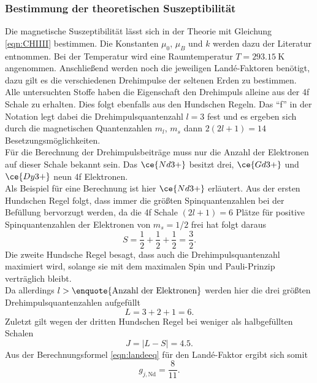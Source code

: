 \subsubsection{Bestimmung der theoretischen Suszeptibilität}

Die magnetische Suszeptibilität lässt sich in der Theorie mit Gleichung \eqref{eqn:CHIIII} bestimmen. Die Konstanten $\mu_0$, $\mu_B$ und $k$ werden dazu der Literatur \cite{lit2} entnommen.
Bei der Temperatur wird eine Raumtemperatur $T = \SI{293.15}{\kelvin}$ angenommen.
Anschließend werden noch die jeweiligen Landé-Faktoren benötigt, dazu gilt es die verschiedenen Drehimpulse der seltenen Erden zu bestimmen. Alle untersuchten Stoffe haben die Eigenschaft
den Drehimpuls alleine aus der 4f Schale zu erhalten. Dies folgt ebenfalls aus den Hundschen Regeln. Das \enquote{f} in der Notation legt dabei die Drehimpulsquantenzahl $l = 3$ fest und es ergeben sich
durch die magnetischen Quantenzahlen $m_l$, $m_s$ dann $2(2l+1) = 14$ Besetzungsmöglichkeiten. 
\\
Für die Berechnung der Drehimpulsbeiträge muss nur die Anzahl der Elektronen auf dieser Schale bekannt sein. Das $\ce{Nd3+}$ besitzt drei, $\ce{Gd3+}$ und $\ce{Dy3+}$ neun 4f Elektronen.
\\
Als Beispiel für eine Berechnung ist hier $\ce{Nd3+}$ erläutert.
Aus der ersten Hundschen Regel folgt, dass immer die größten Spinquantenzahlen bei der Befüllung bervorzugt werden, da die 4f Schale $(2l+1) = 6$ Plätze für positive Spinquantenzahlen der Elektronen
von $m_s = 1$/$2$ frei hat folgt daraus
\begin{equation*}
S = \frac{1}{2} + \frac{1}{2} + \frac{1}{2} =  \frac{3}{2}.
\end{equation*}
Die zweite Hundsche Regel besagt, dass auch die Drehimpulsquantenzahl maximiert wird, solange sie mit dem maximalen Spin und Pauli-Prinzip verträglich bleibt. 
\\
Da allerdings $l > \text{\enquote{Anzahl der Elektronen}}$
werden hier die drei größten Drehimpulsquantenzahlen aufgefüllt
\begin{equation*}
    L = 3 + 2 + 1 =  6.
\end{equation*}
Zuletzt gilt wegen der dritten Hundschen Regel bei weniger als halbgefüllten Schalen
\begin{equation*}
    J = |L - S| = 4.5.
\end{equation*}
Aus der Berechnungsformel \eqref{eqn:landeeq} für den Landé-Faktor ergibt sich somit
\begin{equation*}
g_{j,\text{Nd}} = \frac{8}{11}.
\end{equation*}
